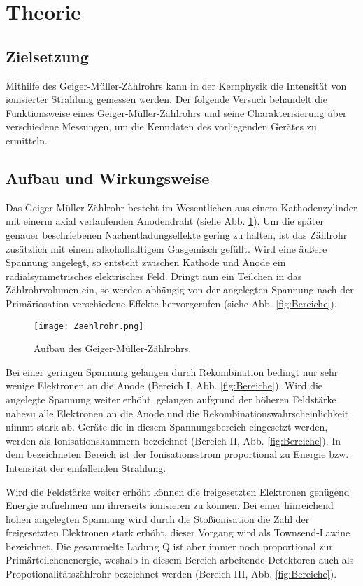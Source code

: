 \section{Theorie}

\subsection{Zielsetzung}

Mithilfe des Geiger-Müller-Zählrohrs kann in der Kernphysik die Intensität von
ionisierter Strahlung gemessen werden. Der folgende Versuch behandelt
die Funktionsweise eines Geiger-Müller-Zählrohrs und seine Charakterisierung
über verschiedene Messungen, um die Kenndaten des vorliegenden Gerätes zu ermitteln.

\subsection{Aufbau und Wirkungsweise}

Das Geiger-Müller-Zählrohr besteht im Wesentlichen aus einem Kathodenzylinder
mit einerm axial verlaufenden Anodendraht (siehe Abb. \ref{fig:Geiger}). Um die
später genauer beschriebenen Nachentladungseffekte gering zu halten, ist das
Zählrohr zusätzlich mit einem alkoholhaltigem Gasgemisch gefüllt. Wird eine
äußere Spannung angelegt, so entsteht zwischen Kathode und Anode ein
radialsymmetrisches elektrisches Feld. Dringt nun ein Teilchen in das Zählrohrvolumen ein,
so werden abhängig von der angelegten Spannung nach der Primäriosation
verschiedene Effekte hervorgerufen (siehe Abb. \ref{fig:Bereiche}).

\begin{figure}
  \centering
  \texttt{[image: Zaehlrohr.png]}
  \caption{Aufbau des Geiger-Müller-Zählrohrs.}
  \label{fig:Geiger}
\end{figure}

Bei einer geringen Spannung gelangen durch Rekombination bedingt nur sehr
wenige Elektronen an die Anode (Bereich I, Abb. \ref{fig:Bereiche}). Wird die
angelegte Spannung weiter erhöht, gelangen aufgrund der höheren Feldstärke nahezu
alle Elektronen an die Anode und die Rekombinationswahrscheinlichkeit nimmt
stark ab. Geräte die in diesem Spannungsbereich eingesetzt werden, werden als
Ionisationskammern bezeichnet (Bereich II, Abb. \ref{fig:Bereiche}).
In dem bezeichneten Bereich ist der Ionisationsstrom proportional zu Energie bzw.
Intensität der einfallenden Strahlung.

Wird die Feldstärke weiter erhöht können die freigesetzten Elektronen
genügend Energie aufnehmen um ihrerseits ionisieren zu können. Bei einer hinreichend
hohen angelegten Spannung wird durch die Stoßionisation die Zahl der freigesetzten
Elektronen stark erhöht, dieser Vorgang wird als Townsend-Lawine bezeichnet.
Die gesammelte Ladung Q ist aber immer noch proportional zur Primärteilchenenergie,
weshalb in diesem Bereich arbeitende Detektoren auch als Propotionalitätszählrohr
bezeichnet werden (Bereich III, Abb. \ref{fig:Bereiche}).

